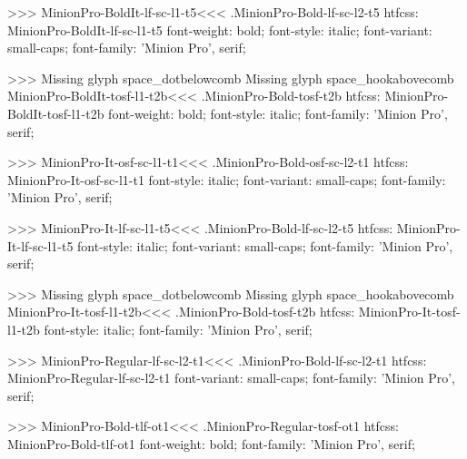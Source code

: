 {>>>
\<MinionPro-BoldIt-lf-sc-l1-t5\><<<
.MinionPro-Bold-lf-sc-l2-t5
htfcss:  MinionPro-BoldIt-lf-sc-l1-t5  font-weight: bold; font-style: italic; font-variant: small-caps; font-family: 'Minion Pro', serif;

>>>
Missing glyph	space_dotbelowcomb
Missing glyph	space_hookabovecomb
\<MinionPro-BoldIt-tosf-l1-t2b\><<<
.MinionPro-Bold-tosf-t2b
htfcss:  MinionPro-BoldIt-tosf-l1-t2b  font-weight: bold; font-style: italic; font-family: 'Minion Pro', serif;

>>>
\<MinionPro-It-osf-sc-l1-t1\><<<
.MinionPro-Bold-osf-sc-l2-t1
htfcss:  MinionPro-It-osf-sc-l1-t1  font-style: italic; font-variant: small-caps; font-family: 'Minion Pro', serif;

>>>
\<MinionPro-It-lf-sc-l1-t5\><<<
.MinionPro-Bold-lf-sc-l2-t5
htfcss:  MinionPro-It-lf-sc-l1-t5  font-style: italic; font-variant: small-caps; font-family: 'Minion Pro', serif;

>>>
Missing glyph	space_dotbelowcomb
Missing glyph	space_hookabovecomb
\<MinionPro-It-tosf-l1-t2b\><<<
.MinionPro-Bold-tosf-t2b
htfcss:  MinionPro-It-tosf-l1-t2b  font-style: italic; font-family: 'Minion Pro', serif;

>>>
\<MinionPro-Regular-lf-sc-l2-t1\><<<
.MinionPro-Bold-lf-sc-l2-t1
htfcss:  MinionPro-Regular-lf-sc-l2-t1  font-variant: small-caps; font-family: 'Minion Pro', serif;

>>>
\<MinionPro-Bold-tlf-ot1\><<<
.MinionPro-Regular-tosf-ot1
htfcss:  MinionPro-Bold-tlf-ot1  font-weight: bold; font-family: 'Minion Pro', serif;

}
